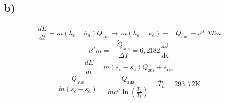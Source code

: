 

\subsection*{b)}
\[
\frac{d\dot{E}}{dt} = \dot{m} (h_e - h_a) \dot{Q}_{\text{aus}} \Rightarrow \dot{m} (h_a - h_e) = -\dot{Q}_{\text{aus}} = c^{it} \Delta T \dot{m}
\]
\[
c^{it} \dot{m} = -\frac{\dot{Q}_{\text{aus}}}{\Delta T} = 6,2182 \frac{\text{kJ}}{\text{sK}}
\]
\[
\frac{d\dot{E}}{dt} = \dot{m} (s_e - s_a) \dot{Q}_{\text{aus}} + s_{\text{rev}}
\]
\[
\frac{\dot{Q}_{\text{aus}}}{\dot{m} (s_e - s_a)} = \frac{\dot{Q}_{\text{aus}}}{\dot{m} c^{it} \ln \left( \frac{T_2}{T_1} \right)} = \bar{T}_h = 293,72 \text{K}
\]